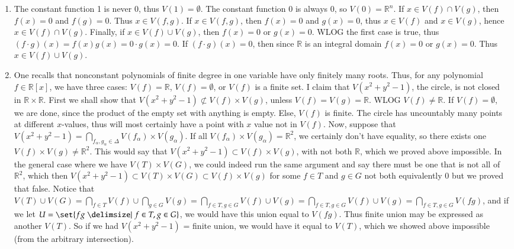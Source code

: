 \documentclass[12pt]{article}
\theoremstyle{definitionstyle}
\def\mbb#1{\mathbb{#1}}
\def \R{\mbb{R}}
\begin{document}
\begin{enumerate}[leftmargin=\labelsep]
		\item The constant function 1 is never 0, thus $V(1) = \emptyset$. The constant function 0 is always 0, so $V(0) = \R^n$. If $x \in V(f) \cap V(g)$, then $f(x) = 0$ and $f(g) = 0$. Thus $x \in V(f, g)$. If $x \in V(f, g)$, then $f(x) = 0$ and $g(x) = 0$, thus $x \in V(f)$ and $x \in V(g)$, hence $x \in V(f) \cap V(g)$. Finally, if $x \in V(f) \cup V(g)$, then $f(x) = 0$ or $g(x) = 0$. WLOG the first case is true, thus $(f \cdot g)(x) = f(x) g(x) = 0 \cdot g(x) = 0$. If $(f \cdot g)(x) = 0$, then since $\R$ is an integral domain $f(x) = 0$ or $g(x) = 0$. Thus $x \in V(f) \cup V(g)$.
		
		\item 
		One recalls that nonconstant polynomials of finite degree in one variable have only finitely many roots. Thus, for any polynomial $f \in \R[x]$, we have three cases: $V(f) = \R$, $V(f) = \emptyset$, or $V(f)$ is a finite set. I claim that $V(x^2+y^2-1)$, the circle, is not closed in $\R \times \R$. First we shall show that $V(x^2+y^2-1) \not \subset V(f) \times V(g)$, unless $V(f) = V(g) = \R$. WLOG $V(f) \neq \R$. If $V(f) = \emptyset$, we are done, since the product of the empty set with anything is empty. Else, $V(f)$ is finite. The circle has uncountably many points at different $x$-values, thus will most certainly have a point with $x$ value not in $V(f)$. Now, suppose that $V(x^2+y^2-1) = \bigcap_{f_\alpha, g_\alpha \in \Delta} V(f_\alpha) \times V(g_\alpha)$. If all $V(f_\alpha) \times V(g_\alpha) = \R^2$, we certainly don't have equality, so there exists one $V(f) \times V(g) \neq \R^2$. This would say that $V(x^2+y^2-1) \subset V(f) \times V(g)$, with not both $\R$, which we proved above impossible. In the general case where we have $V(T) \times V(G)$, we could indeed run the same argument and say there must be one that is not all of $\R^2$, which then $V(x^2+y^2-1) \subset V(T) \times V(G) \subset V(f) \times V(g)$ for some $f \in T$ and $g \in G$ not both equivalently 0 but we proved that false. Notice that $V(T) \cup V(G) = \bigcap_{f \in T} V(f) \cup \bigcap_{g \in G} V(g) = \bigcap_{f \in T, g \in G} V(f) \cup V(g) = \bigcap_{f \in T, g \in G} V(f) \cup V(g) = \bigcap_{f \in T, g \in G} V(fg)$, and if we let $U = \set{fg \given f \in T, g \in G}$, we would have this union equal to $V(fg)$. Thus finite union may be expressed as another $V(T)$. So if we had $V(x^2+y^2-1)$ = finite union, we would have it equal to $V(T)$, which we showed above impossible (from the arbitrary intersection).
	\end{enumerate}
\end{document}
